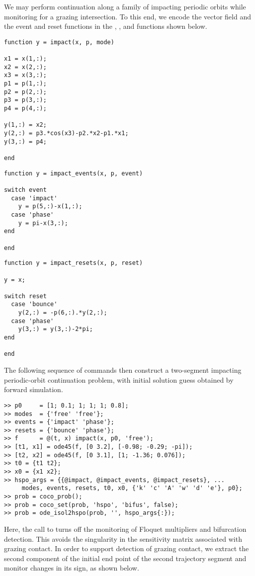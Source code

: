 We may perform continuation along a family of impacting periodic orbits while monitoring for a grazing intersection. To this end, we encode the vector field and the event and reset functions in the , , and  functions shown below.
\begin{lstlisting}[language=coco-highlight]
function y = impact(x, p, mode)

x1 = x(1,:);
x2 = x(2,:);
x3 = x(3,:);
p1 = p(1,:);
p2 = p(2,:);
p3 = p(3,:);
p4 = p(4,:);

y(1,:) = x2;
y(2,:) = p3.*cos(x3)-p2.*x2-p1.*x1;
y(3,:) = p4;

end
\end{lstlisting}
\begin{lstlisting}[language=coco-highlight]
function y = impact_events(x, p, event)

switch event
  case 'impact'
    y = p(5,:)-x(1,:);
  case 'phase'
    y = pi-x(3,:);
end

end
\end{lstlisting}
\begin{lstlisting}[language=coco-highlight]
function y = impact_resets(x, p, reset)

y = x;

switch reset
  case 'bounce'
    y(2,:) = -p(6,:).*y(2,:);
  case 'phase'
    y(3,:) = y(3,:)-2*pi;
end

end
\end{lstlisting}
The following sequence of commands then construct a two-segment impacting periodic-orbit continuation problem, with initial solution guess obtained by forward simulation.
\begin{lstlisting}[language=coco-highlight]
>> p0     = [1; 0.1; 1; 1; 1; 0.8];
>> modes  = {'free' 'free'};
>> events = {'impact' 'phase'};
>> resets = {'bounce' 'phase'};
>> f      = @(t, x) impact(x, p0, 'free');
>> [t1, x1] = ode45(f, [0 3.2], [-0.98; -0.29; -pi]);
>> [t2, x2] = ode45(f, [0 3.1], [1; -1.36; 0.076]);
>> t0 = {t1 t2};
>> x0 = {x1 x2};
>> hspo_args = {{@impact, @impact_events, @impact_resets}, ...
     modes, events, resets, t0, x0, {'k' 'c' 'A' 'w' 'd' 'e'}, p0};
>> prob = coco_prob();
>> prob = coco_set(prob, 'hspo', 'bifus', false);
>> prob = ode_isol2hspo(prob, '', hspo_args{:});
\end{lstlisting}
Here, the call to  turns off the monitoring of Floquet multipliers and bifurcation detection. This avoids the singularity in the sensitivity matrix associated with grazing contact. In order to support detection of grazing contact, we extract the second component of the initial end point of the second trajectory segment and monitor changes in its sign, as shown below.
